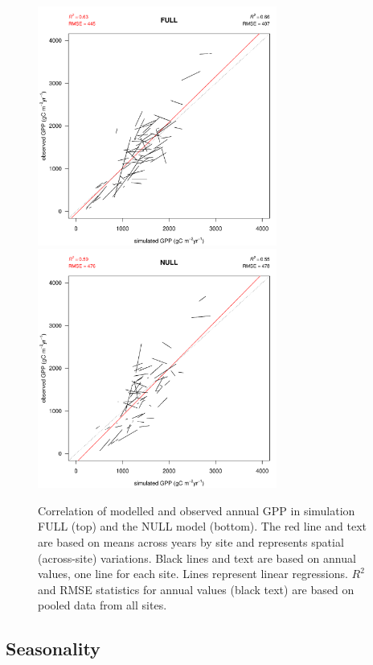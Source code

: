 \documentclass{myreport}
\begin{document}
\begin{figure}[!ht]
    \centering
    \includegraphics[width=0.7\textwidth]{fig/modobs_spatial_annual_FULL.pdf}
    \includegraphics[width=0.7\textwidth]{fig/modobs_spatial_annual_NULL.pdf}
    \caption{Correlation of modelled and observed annual GPP in simulation FULL (top) and the NULL model (bottom). The red line and text are based on means across years by site and represents spatial (across-site) variations. Black lines and text are based on annual values, one line for each site. Lines represent linear regressions. $R^2$ and RMSE statistics for annual values (black text) are based on pooled data from all sites.}
    \label{fig:modobs_spatialannual}
\end{figure}

\clearpage

\subsection{Seasonality}
 
\end{document}
